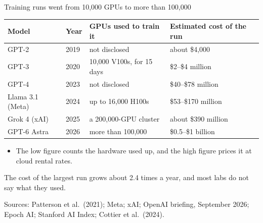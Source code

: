 \documentclass[aspectratio=169,11pt]{beamer}
\begin{document}
\begin{frame}{Training runs went from 10,000 GPUs to more than 100,000}

\begin{center}
\footnotesize
\begin{tabular}{@{}llll@{}}
\toprule
\textbf{Model} & \textbf{Year} & \textbf{GPUs used to train it} & \textbf{Estimated cost of the run} \\
\midrule
GPT-2 & 2019 & not disclosed & about \$4,000 \\
GPT-3 & 2020 & 10,000 V100s, for 15 days & \$2--\$4 million \\
GPT-4 & 2023 & not disclosed & \$40--\$78 million \\
Llama 3.1 (Meta) & 2024 & up to 16,000 H100s & \$53--\$170 million \\
Grok 4 (xAI) & 2025 & a 200,000-GPU cluster & about \$390 million \\
GPT-6 Astra & 2026 & more than 100,000 & \$0.5--\$1 billion \\
\bottomrule
\end{tabular}
\end{center}

\vspace{0.05cm}

\begin{itemize}\setlength\itemsep{0.1em}
    \item The low figure counts the hardware used up, and the high figure prices it at cloud rental rates.
\end{itemize}

\vspace{0.1cm}

\alert{The cost of the largest run grows about 2.4 times a year, and most labs do not say what they used.}

\vspace{0.05cm}
{\scriptsize\color{warmgray}Sources: Patterson et al.\ (2021); Meta; xAI; OpenAI briefing, September 2026; Epoch AI; Stanford AI Index; Cottier et al.\ (2024).}

\end{frame}
\end{document}
